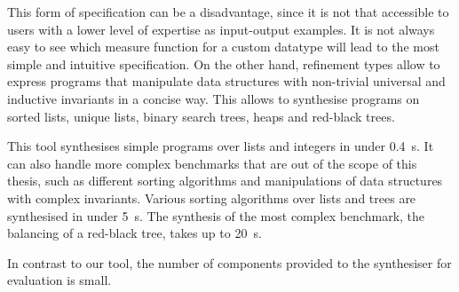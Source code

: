 This form of specification can be a disadvantage, since it is not that accessible to users with a lower level of expertise as input-output examples. It is not always easy to see which measure function for a custom datatype will lead to the most simple and intuitive specification.
On the other hand, refinement types allow to express programs that manipulate data structures with non-trivial universal and inductive invariants in a concise way. This allows to synthesise programs on sorted lists, unique lists, binary search trees, heaps and red-black trees.

This tool synthesises simple programs over lists and integers in under \SI{0.4}{s}. It can also handle more complex benchmarks that are out of the scope of this thesis, such as different sorting algorithms and manipulations of data structures with complex invariants. Various sorting algorithms over lists and trees are synthesised in under \SI{5}{s}. The synthesis of the most complex benchmark, the balancing of a red-black tree, takes up to \SI{20}{s}.

In contrast to our tool, the number of components provided to the synthesiser for evaluation is small.

